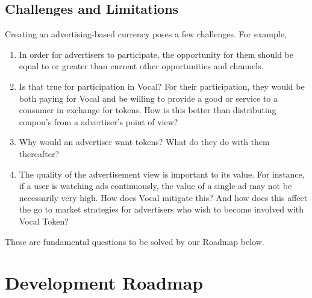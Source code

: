 \documentclass[conference]{IEEEtran}
\begin{document}


    \subsection{Challenges and Limitations}

    Creating an advertising-based currency poses a few challenges. For example,

    \begin{enumerate}
      \item In order for advertisers to participate, the opportunity for them should be equal to or greater than current other opportunities and channels. 
      \item Is that true for participation in Vocal? For their participation, they would be both paying for Vocal and be willing to provide a good or service to a consumer in exchange for tokens. How is this better than distributing coupon’s from a advertiser’s point of view?
      \item Why would an advertiser want tokens? What do they do with them thereafter?
      \item The quality of the advertisement view is important to its value. For instance, if a user is watching ads continuously, the value of a single ad may not be necessarily very high. How does Vocal mitigate this? And how does this affect the go to market strategies for advertisers who wish to become involved with Vocal Token?
    \end{enumerate}

    These are fundamental questions to be solved by our Roadmap below.
    
    \section{Development Roadmap}

\end{document}
